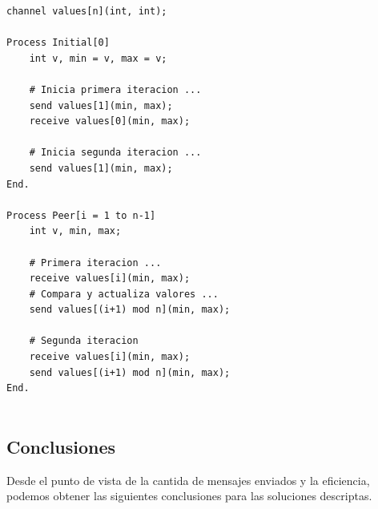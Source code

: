 \documentclass[a4paper, 10pt]{report}
\begin{document}
\begin{multicols}{2}
\begin{lstlisting}
channel values[n](int, int);

Process Initial[0]
	int v, min = v, max = v;

	# Inicia primera iteracion ...
	send values[1](min, max);
	receive values[0](min, max);

	# Inicia segunda iteracion ...
	send values[1](min, max);
End.
		
Process Peer[i = 1 to n-1]
	int v, min, max;

	# Primera iteracion ...
	receive values[i](min, max);
	# Compara y actualiza valores ...
	send values[(i+1) mod n](min, max);

	# Segunda iteracion
	receive values[i](min, max);
	send values[(i+1) mod n](min, max);
End.
	

\end{lstlisting}
	
\columnbreak
	
\centering
\vspace*{\fill}
\vspace*{\fill}
\end{multicols}

\subsection{Conclusiones}

Desde el punto de vista de la cantida de mensajes enviados y la eficiencia, podemos obtener las siguientes conclusiones para las soluciones descriptas.
\end{document}
